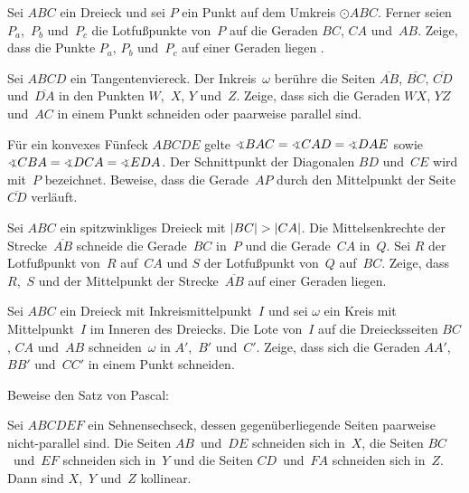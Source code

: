 \begin{aufgabe*}
	Sei $ABC$ ein Dreieck und sei $P$ ein Punkt auf dem Umkreis $\odot ABC$. Ferner seien $P_a$,~$P_b$ und~$P_c$ die Lotfußpunkte von~$P$ auf die Geraden $BC$, $CA$ und~$AB$. Zeige, dass die Punkte $P_a$, $P_b$ und~$P_c$ auf einer Geraden liegen .
\end{aufgabe*}

\begin{aufgabe*}
	Sei $ABCD$ ein Tangentenviereck. Der Inkreis~$\omega$ berühre die Seiten $\overline{AB}$, $\overline{BC}$, $\overline{CD}$ und~$\overline{DA}$ in den Punkten $W$,~$X$, $Y$ und~$Z$. Zeige, dass sich die Geraden $WX$, $YZ$ und~$AC$ in einem Punkt schneiden oder paarweise parallel sind.
\end{aufgabe*}

\begin{aufgabe*}
	Für ein konvexes Fünfeck $ABCDE$ gelte $\winkel BAC=\winkel CAD=\winkel DAE$ sowie $\winkel CBA=\winkel DCA=\winkel EDA$. Der Schnittpunkt der Diagonalen $BD$ und~$CE$ wird mit~$P$ bezeichnet. Beweise, dass die Gerade~$AP$ durch den Mittelpunkt der Seite~$\overline{CD}$ verläuft.
\end{aufgabe*}

\begin{aufgabe*}
	Sei $ABC$ ein spitzwinkliges Dreieck mit $\lvert BC\rvert>\lvert CA\rvert$. Die Mittelsenkrechte der Strecke~$\overline{AB}$ schneide die Gerade~$BC$ in~$P$ und die Gerade~$CA$ in~$Q$. Sei $R$ der Lotfußpunkt von~$R$ auf~$CA$ und $S$ der Lotfußpunkt von~$Q$ auf~$BC$. Zeige, dass $R$,~$S$ und der Mittelpunkt der Strecke~$\overline{AB}$ auf einer Geraden liegen. 
\end{aufgabe*}

\begin{aufgabe*}[*]
	Sei $ABC$ ein Dreieck mit Inkreismittelpunkt~$I$ und sei $\omega$ ein Kreis mit Mittelpunkt~$I$ im Inneren des Dreiecks. Die Lote von~$I$ auf die Dreiecksseiten $BC$, $CA$ und~$AB$ schneiden~$\omega$ in $A'$,~$B'$ und~$C'$. Zeige, dass sich die Geraden $AA'$, $BB'$ und~$CC'$ in einem Punkt schneiden.
\end{aufgabe*}

\begin{aufgabe*}[***]
	Beweise den Satz von Pascal:
	\begin{satzmitnamen}
		Sei $ABCDEF$ ein Sehnensechseck, dessen gegenüberliegende Seiten paarweise nicht-parallel sind. Die Seiten $AB$~und~$DE$ schneiden sich in~$X$, die Seiten $BC$~und~$EF$ schneiden sich in~$Y$ und die Seiten $CD$~und~$FA$ schneiden sich in~$Z$. Dann sind $X$,~$Y$ und~$Z$ kollinear.
	\end{satzmitnamen}
\end{aufgabe*}